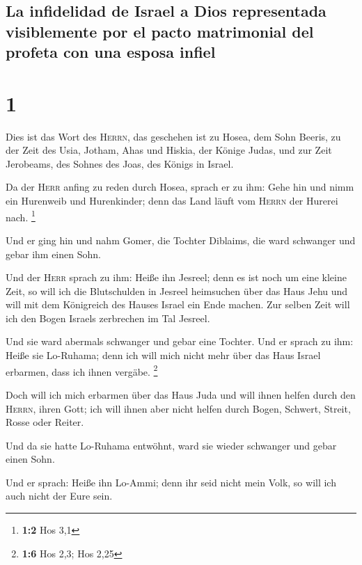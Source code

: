 \hypertarget{la-infidelidad-de-israel-a-dios-representada-visiblemente-por-el-pacto-matrimonial-del-profeta-con-una-esposa-infiel}{%
\subsection{La infidelidad de Israel a Dios representada visiblemente
por el pacto matrimonial del profeta con una esposa
infiel}\label{la-infidelidad-de-israel-a-dios-representada-visiblemente-por-el-pacto-matrimonial-del-profeta-con-una-esposa-infiel}}

\hypertarget{section}{%
\section{1}\label{section}}

 Dies ist das Wort des \textsc{Herrn}, das geschehen ist
zu Hosea, dem Sohn Beeris, zu der Zeit des Usia, Jotham, Ahas und
Hiskia, der Könige Judas, und zur Zeit Jerobeams, des Sohnes des Joas,
des Königs in Israel.

 Da der \textsc{Herr} anfing zu reden durch Hosea, sprach
er zu ihm: Gehe hin und nimm ein Hurenweib und Hurenkinder; denn das
Land läuft vom \textsc{Herrn} der Hurerei nach. \footnote{\textbf{1:2}
  Hos 3,1}

 Und er ging hin und nahm Gomer, die Tochter Diblaims, die
ward schwanger und gebar ihm einen Sohn.

 Und der \textsc{Herr} sprach zu ihm: Heiße ihn Jesreel;
denn es ist noch um eine kleine Zeit, so will ich die Blutschulden in
Jesreel heimsuchen über das Haus Jehu und will mit dem Königreich des
Hauses Israel ein Ende machen.  Zur selben Zeit will ich
den Bogen Israels zerbrechen im Tal Jesreel.

 Und sie ward abermals schwanger und gebar eine Tochter.
Und er sprach zu ihm: Heiße sie Lo-Ruhama; denn ich will mich nicht mehr
über das Haus Israel erbarmen, dass ich ihnen vergäbe. \footnote{\textbf{1:6}
  Hos 2,3; Hos 2,25}

 Doch will ich mich erbarmen über das Haus Juda und will
ihnen helfen durch den \textsc{Herrn}, ihren Gott; ich will ihnen aber
nicht helfen durch Bogen, Schwert, Streit, Rosse oder Reiter.

 Und da sie hatte Lo-Ruhama entwöhnt, ward sie wieder
schwanger und gebar einen Sohn.

 Und er sprach: Heiße ihn Lo-Ammi; denn ihr seid nicht
mein Volk, so will ich auch nicht der Eure sein.

